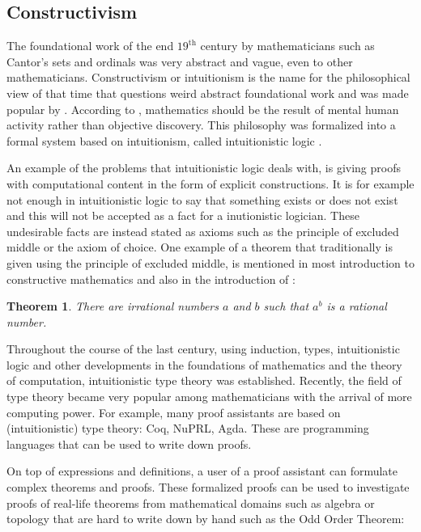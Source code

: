 \documentclass[12pt,a4paper,twoside,xetex]{book}
\newtheorem{theorem}{Theorem}[section]
\begin{document}
\subsection{Constructivism}\label{constructivism}

The foundational work of the end $19^{\text{th}}$ century by mathematicians such as Cantor's sets and ordinals was very abstract and vague, even to other mathematicians. Constructivism or intuitionism is the name for the philosophical view of that time that questions weird abstract foundational work and was made popular by \cite{Brouwer1905}. According to \cite{Brouwer1905}, mathematics should be the result of mental human activity rather than objective discovery. This philosophy was formalized into a formal system based on intuitionism, called intuitionistic logic \cite{Heyting1930}. 

An example of the problems  that intuitionistic logic deals with, is giving proofs with computational content in the form of explicit constructions. It is for example not enough in intuitionistic logic to say that something exists or does not exist and this will not be accepted as a fact for a inutionistic logician. These undesirable facts are instead stated as axioms such as the principle of excluded middle or the axiom of choice. One example of a theorem that traditionally is given using the principle of excluded middle, is mentioned in most introduction to constructive mathematics and also in the introduction of \cite{Palmgren2014}:

\begin{theorem}
  There are irrational numbers $a$ and $b$ such that $a^b$ is a rational number.
\end{theorem} 

Throughout the course of the last century, using induction, types, intuitionistic logic and other developments in the foundations of mathematics and the theory of computation, intuitionistic type theory \cite{Martin-Loef1975} was established. Recently, the field of type theory became very popular among mathematicians with the arrival of more computing power. For example, many proof assistants are based on (intuitionistic) type theory: Coq, NuPRL, Agda. These are programming languages that can be used to write down proofs.

On top of expressions and definitions, a user of a proof assistant can formulate complex theorems and proofs. These formalized proofs can be used to investigate proofs of real-life theorems from mathematical domains such as algebra or topology that are hard to write down by hand such as the Odd Order Theorem:
\end{document}
